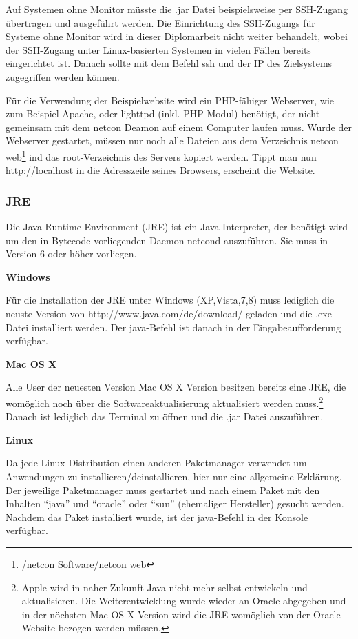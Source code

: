 \documentclass[a4paper,14pt,headsepline]{scrartcl}
\begin{document}
Auf Systemen ohne Monitor müsste die .jar Datei beispielsweise per SSH-Zugang übertragen und ausgeführt werden. Die Einrichtung des SSH-Zugangs für Systeme ohne Monitor wird in dieser Diplomarbeit nicht weiter behandelt, wobei der SSH-Zugang unter Linux-basierten Systemen in vielen Fällen bereits eingerichtet ist. Danach sollte mit dem Befehl ssh und der IP des Zielsystems zugegriffen werden können. 

Für die Verwendung der Beispielwebsite wird ein PHP-fähiger Webserver, wie zum Beispiel Apache, oder lighttpd (inkl. PHP-Modul) benötigt, der nicht gemeinsam mit dem netcon Deamon auf einem Computer laufen muss. Wurde der Webserver gestartet, müssen nur noch alle Dateien aus dem Verzeichnis netcon web\footnote{/netcon Software/netcon web} ind das root-Verzeichnis des Servers kopiert werden. Tippt man nun http://localhost in die Adresszeile seines Browsers, erscheint die Website.   

\subsubsection{JRE}
Die Java Runtime Environment (JRE) ist ein Java-Interpreter, der benötigt wird um den in Bytecode vorliegenden Daemon netcond auszuführen. Sie muss in Version 6 oder höher vorliegen. 

\textbf{Windows}

Für die Installation der JRE unter Windows (XP,Vista,7,8) muss lediglich die neuste Version von http://www.java.com/de/download/ geladen und die .exe Datei installiert werden. Der java-Befehl ist danach in der Eingabeaufforderung verfügbar. 

\textbf{Mac OS X}

Alle User der neuesten Version Mac OS X Version besitzen bereits eine JRE, die womöglich noch über die Softwareaktualisierung aktualisiert werden muss.\footnote{Apple wird in naher Zukunft Java nicht mehr selbst entwickeln und aktualisieren. Die Weiterentwicklung wurde wieder an Oracle abgegeben und in der nöchsten Mac OS X Version wird die JRE womöglich von der Oracle-Website bezogen werden müssen.} Danach ist lediglich das Terminal zu öffnen und die .jar Datei auszuführen. 

\newpage

\textbf{Linux}

Da jede Linux-Distribution einen anderen Paketmanager verwendet um Anwendungen zu installieren/deinstallieren, hier nur eine allgemeine Erklärung. Der jeweilige Paketmanager muss gestartet und nach einem Paket mit den Inhalten ``java'' und ``oracle'' oder ``sun'' (ehemaliger Hersteller) gesucht werden. Nachdem das Paket installiert wurde, ist der java-Befehl in der Konsole verfügbar.  
\end{document}

